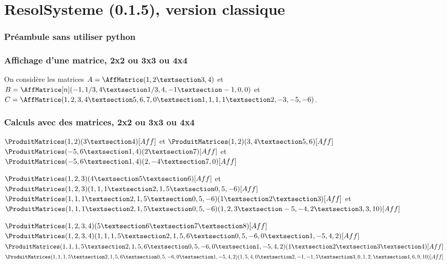 \documentclass[french,a4paper,10pt]{article}
\def\RSver{0.1.5}
\begin{document}
\part*{ResolSysteme (\RSver), version \og classique \fg{}}

\section{Préambule sans utiliser python}


\section{Affichage d'une matrice, 2x2 ou 3x3 ou 4x4}

\begin{ShowCodeTeX}
On considère les matrices $A=\AffMatrice(1,2 § 3,4)$
et $B=\AffMatrice[n](-1,1/3,4 § 1/3,4,-1 § -1,0,0)$
et $C=\AffMatrice(1,2,3,4 § 5,6,7,0 § 1,1,1,1 § 2,-3,-5,-6)$.
\end{ShowCodeTeX}

\section{Calculs avec des matrices, 2x2 ou 3x3 ou 4x4}

\begin{ShowCodeTeX}
$\ProduitMatrices(1,2)(3 § 4)[Aff]$ et $\ProduitMatrices(1,2)(3,4 § 5,6)[Aff]$ \\
$\ProduitMatrices(-5,6 § 1,4)(2 § 7)[Aff]$ et $\ProduitMatrices(-5,6 § 1,4)(2,-4 § 7,0)[Aff]$
\end{ShowCodeTeX}

\begin{ShowCodeTeX}
$\ProduitMatrices(1,2,3)(4 § 5 § 6)[Aff]$ et $\ProduitMatrices(1,2,3)(1,1,1 § 2,1,5 § 0,5,-6)[Aff]$\\
$\ProduitMatrices(1,1,1 § 2,1,5 § 0,5,-6)(1 § 2 § 3)[Aff]$ et
$\ProduitMatrices(1,1,1 § 2,1,5 § 0,5,-6)(1,2,3 § -5,-4,2 § 3,3,10)[Aff]$
\end{ShowCodeTeX}

\begin{ShowCodeTeX}
$\ProduitMatrices(1,2,3,4)(5 § 6 § 7 § 8)[Aff]$\\
$\ProduitMatrices(1,2,3,4)(1,1,1,5 § 2,1,5,6 § 0,5,-6,0 § 1,-5,4,2)[Aff]$\\
$\ProduitMatrices(1,1,1,5 § 2,1,5,6 § 0,5,-6,0 § 1,-5,4,2)(1 § 2 § 3 § 4)[Aff]$\\
$\ProduitMatrices(1,1,1,5 § 2,1,5,6 § 0,5,-6,0 § 1,-5,4,2)(1,5,4,0 § 2,-1,-1,5 § 3,0,1,2, § 4,6,9,10)[Aff]$
\end{ShowCodeTeX}
\end{document}
